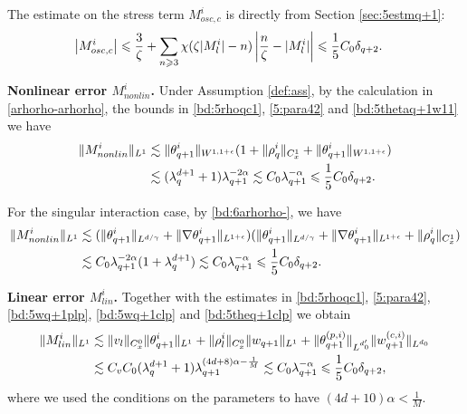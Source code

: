 \documentclass[UTF-8,reqno]{amsart}
\numberwithin{equation}{section}
\theoremstyle{definition}
\def\geq{\geqslant}
\def\leq{\leqslant}
\def\geq{\geqslant}
\def\leq{\leqslant}
\begin{document}
The estimate on  the stress term $M^i_{osc,c}$ is directly from Section \ref{sec:5estmq+1}:
\begin{align}
     \left| M^i_{osc,c} \right|%
     &\leq \frac{3}{\zeta }+\sum_{n\geq3}\chi(\zeta |M^i_l |-n)\left|\frac{n}{\zeta }- |M^i_l |\right|\leq  \frac15C_0\delta_{q+2}.\notag
\end{align}

 

\textbf{Nonlinear error $M^i_{nonlin} $.} Under Assumption \ref{def:ass}, by the calculation in \eqref{arhorho-arhorho},   the bounds in   \eqref{bd:5rhoqc1}, \eqref{5:para42} and \eqref{bd:5thetaq+1w11}  we have
\begin{align}
    \|M^i_{nonlin}\|_{L^1} 
      &\lesssim \|\theta^{i}_{q+1}\|_{W^{1,1+\epsilon}} (1+\|\rho^{i}_{q}\|_{C_{x}^1}+\| \theta_{q+1}^i\|_{W^{1,1+\epsilon}} ) \notag\\
      &\lesssim (\lambda_{q}^{ d+1}+1)\lambda_{q+1}^{-2\alpha} \lesssim    C_0 \lambda_{q+1}^{-\alpha}\leq \frac{1}{5}C_0 \delta_{q+2}.\notag
\end{align} 

For the singular interaction case, by \eqref{bd:6arhorho-},  we have
\begin{align*}
    \|M^i_{nonlin}\|_{L^1} 
     &\lesssim (\| \theta_{q+1}^i \|_{L^{d/\gamma}}+\|  \nabla \theta_{q+1}^i\|_{L^{1+\epsilon}})(\| \theta_{q+1}^i \|_{L^{d/\gamma}}+\|  \nabla \theta_{q+1}^i\|_{L^{1+\epsilon}}+\| \rho_q^i\|_{C_{x}^1}) \\
     &\lesssim C_0\lambda_{q+1}^{-2\alpha}(1+\lambda_q^{d+1})\lesssim    C_0 \lambda_{q+1}^{-\alpha}\leq \frac{1}{5}C_0 \delta_{q+2}.\notag
\end{align*}

\textbf{Linear error $M^i_{lin}$.} 
Together with  the estimates  
in \eqref{bd:5rhoqc1}, \eqref{5:para42},  \eqref{bd:5wq+1plp},  \eqref{bd:5wq+1clp} and   \eqref{bd:5theq+1clp}     we obtain
\begin{align}
 \|M^i_{lin}\|_{L^1}&\lesssim \|v_l\|_ {C_{x}^0}\|\theta^i_{q+1} \|_{L^1}+\|  \rho^i_l\|_ {C_{x}^0}
\|w_{q+1}\|_{L^1}+   \| \theta_{q+1}^{(p,i)}\|_{L^{d_0'}}\|w_{q+1}^{(c,i)}\|_{L^{d_0}}\notag\\
&\lesssim C_vC_0(\lambda_{q}^{ d+1}+1)\lambda_{q+1}^{(4d+8)\alpha-\frac1{M}}
\lesssim   C_0 \lambda_{q+1}^{-\alpha}\leq  \frac{1}{5}C_0 \delta_{q+2},\notag
\end{align}
where we used the   conditions on the parameters to have $(4d+10)\alpha<\frac{1}{M}$. 
\end{document}

